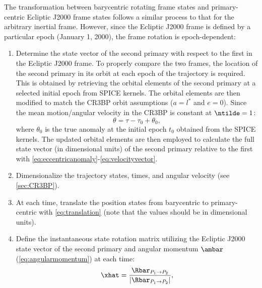 The transformation between barycentric rotating frame states and primary-centric Ecliptic J2000
frame states follows a similar process to that for the arbitrary inertial frame. However, since
the Ecliptic J2000 frame is defined by a particular epoch (January 1, 2000), the frame rotation is
epoch-dependent:
\begin{enumerate}
    \item   Determine the state vector of the second primary with respect to the first in the
            Ecliptic J2000 frame. To properly compare the two frames, the location of the second
            primary in its orbit at each epoch of the trajectory is required. This is obtained by
            retrieving the orbital elements of the second primary at a selected initial epoch from
            SPICE kernels\cite{Semenov:2023}. The orbital elements are then modified to match the
            CR3BP orbit assumptions ($a=l^{*}$ and $e=0$). Since the mean motion/angular velocity
            in the CR3BP is constant at $\ntilde=1$:
            \begin{equation}
                \theta=\tau-\tau_{0}+\theta_{0},
                \label{eq:instantaneoustrueanomaly}
            \end{equation}
            where $\theta_{0}$ is the true anomaly at the initial epoch $t_{0}$ obtained from
            the SPICE kernels. The updated orbital elements are then employed to calculate the full
            state vector (in dimensional units) of the second primary relative to the first with
            \cref{eq:eccentricanomaly}-\cref{eq:velocityvector}.
    \item   Dimensionalize the trajectory states, times, and angular velocity (see
            \cref{sec:CR3BP}).
    \item   At each time, translate the position states from barycentric to primary-centric with
            \cref{eq:translation} (note that the values should be in dimensional units).
    \item   Define the instantaneous state rotation matrix utilizing the Ecliptic J2000 state
            vector of the second primary and angular momentum $\ambar$ (\cref{eq:angularmomentum})
            at each time:
            \begin{equation}
                \xhat=\frac{\Rbar_{P_{1}\rightarrow P_{2}}}{|\Rbar_{P_{1}\rightarrow P_{2}}|},
                \label{eq:xhat}
            \end{equation}
            \vspace{1mm}

\end{enumerate}
